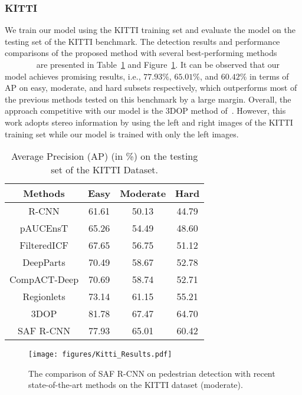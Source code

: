 \documentclass[journal]{IEEEtran}
\begin{document}
\subsubsection{KITTI}
We train our model using the KITTI training set and evaluate the model on the testing set of the KITTI benchmark. The detection results and performance comparisons of the proposed method with several best-performing methods ~\cite{hosang2015taking}~\cite{paisitkriangkrai2014strengthening}~\cite{zhang2015filtered}~\cite{tian2015deep}~\cite{compact}~\cite{wang2013regionlets}~\cite{chen20153d} are presented in Table~\ref{tab:Kitti_Results} and Figure~\ref{fig:Kitti_Results}. It can be observed that our model achieves promising results, i.e., $77.93\%$, $65.01\%$, and $60.42\%$ in terms of AP on easy, moderate, and hard subsets respectively, which outperforms most of the previous methods tested on this benchmark by a large margin. Overall, the approach competitive with our model is the 3DOP method of~\cite{chen20153d}. However, this work adopts stereo information by using the left and right images of the KITTI training set while our model is trained with only the left images.



\begin{table}\setlength{\tabcolsep}{3pt}
	\centering\scriptsize
	\caption{Average Precision (AP) (in \%) on the testing set of the KITTI Dataset.}\label{tab:Kitti_Results}
	\renewcommand{\arraystretch}{1.3}
	\begin{tabular}{c | c | c | c}
\hline
		{\bf Methods} & {\bf Easy} & {\bf Moderate} & {\bf Hard}\\ \hline
		R-CNN & 61.61 & 50.13 & 44.79 \\
		pAUCEnsT & 65.26 & 54.49 & 48.60 \\
		FilteredICF & 67.65 & 56.75 & 51.12 \\
		DeepParts & 70.49 & 58.67 & 52.78 \\
		CompACT-Deep & 70.69 & 58.74 & 52.71 \\
		Regionlets & 73.14 & 61.15 & 55.21 \\		
		3DOP & 81.78 & 67.47 & 64.70 \\	\hline			
		SAF R-CNN & 77.93 & 65.01 & 60.42 \\				
\hline
	\end{tabular}\end{table}

\begin{figure}
	\begin{center}
		\texttt{[image: figures/Kitti\_Results.pdf]}
		\caption{The comparison of SAF R-CNN on pedestrian detection with recent state-of-the-art methods on the KITTI dataset (moderate).}	
		\label{fig:Kitti_Results}
	\end{center}
	\vspace{-4mm}
\end{figure}
\end{document}
